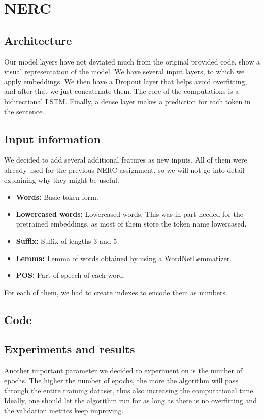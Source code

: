
\section{NERC}%
\label{sec:nerc}

\subsection{Architecture}%
\label{sub:nerc-arch}

Our model layers have not deviated much from the original provided code.  show a visual representation of the model. We have several input layers, to which we apply embeddings. We then have a Dropout layer that helps avoid overfitting, and after that we just concatenate them.  The core of the computations is a bidirectional LSTM. Finally, a dense layer makes a prediction for each token in the sentence.


\subsection{Input information}%
\label{sub:nerc-input}

We decided to add several additional features as new inputs.  All of them were already used for the previous NERC assignment, so we will not go into detail explaining why they might be useful. 
\begin{itemize}
    \item \textbf{Words:} Basic token form.
    \item \textbf{Lowercased words:} Lowercased words. This was in part needed for the pretrained embeddings, as most of them store the token name lowercased.
    \item \textbf{Suffix:} Suffix of lengths 3 and 5
    \item \textbf{Lemma:} Lemma of words obtained by using a WordNetLemmatizer.
    \item \textbf{POS:} Part-of-speech of each word.
\end{itemize}

For each of them, we had to create indexes to encode them as numbers.

\subsection{Code}%
\label{sub:nerc-code}

\subsection{Experiments and results}%
Another important parameter we decided to experiment on is the number of epochs. The higher the number of epochs, the more the algorithm will pass through the entire training dataset, thus also increasing the computational time. Ideally, one should let the algorithm run for as long as there is no overfitting and the validation metrics keep improving.  

